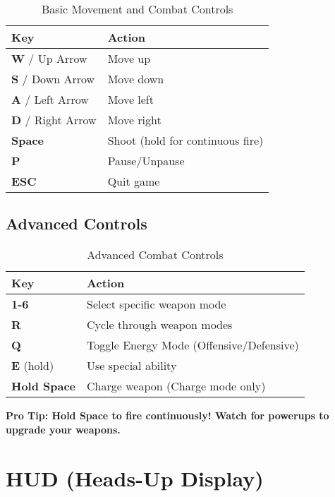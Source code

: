 \documentclass[11pt,a4paper]{article}
\newcommand{\infobox}[2]{%
    \vspace{0.3cm}
    \noindent\colorbox{#1!10}{%
        \parbox{\dimexpr\textwidth-2\fboxsep}{%
            \textcolor{#1}{\textbf{#2}}
        }
    }
    \vspace{0.3cm}
}
\begin{document}
\begin{table}[h]
\centering
\begin{tabularx}{\textwidth}{|l|X|}
\hline
\rowcolor{primarycolor!20}
\textbf{Key} & \textbf{Action} \\
\hline
\textbf{W} / Up Arrow & Move up \\
\hline
\textbf{S} / Down Arrow & Move down \\
\hline
\textbf{A} / Left Arrow & Move left \\
\hline
\textbf{D} / Right Arrow & Move right \\
\hline
\textbf{Space} & Shoot (hold for continuous fire) \\
\hline
\textbf{P} & Pause/Unpause \\
\hline
\textbf{ESC} & Quit game \\
\hline
\end{tabularx}
\caption{Basic Movement and Combat Controls}
\end{table}

\subsection{Advanced Controls}

\begin{table}[h]
\centering
\begin{tabularx}{\textwidth}{|l|X|}
\hline
\rowcolor{primarycolor!20}
\textbf{Key} & \textbf{Action} \\
\hline
\textbf{1-6} & Select specific weapon mode \\
\hline
\textbf{R} & Cycle through weapon modes \\
\hline
\textbf{Q} & Toggle Energy Mode (Offensive/Defensive) \\
\hline
\textbf{E} (hold) & Use special ability \\
\hline
\textbf{Hold Space} & Charge weapon (Charge mode only) \\
\hline
\end{tabularx}
\caption{Advanced Combat Controls}
\end{table}

\infobox{infocolor}{\textbf{Pro Tip:} Hold Space to fire continuously! Watch for powerups to upgrade your weapons.}

\section{HUD (Heads-Up Display)}
\end{document}
